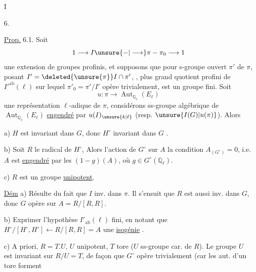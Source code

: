 I

6.

\uline{Prop.} 6.1. Soit
\[
1\longrightarrow I\unsure{-|\longrightarrow}\pi-\pi_0\longrightarrow1
\]
une extension de groupes profinis, et supposons que pour  s-groupe ouvert  $\pi'$ de $\pi$, posant $I'=\deleted{\unsure{\pi}}I\cap\pi'$,   , plus grand quotient profini  de $I'^{\mathrm{ab}}(\ell)$ sur lequel $\pi'_0=\pi'/I'$ opère trivialement, est un groupe fini. Soit
\[
u:\pi\longrightarrow\operatorname{Aut}_{\mathbb Q_\ell}(E_\ell)
\]
une représentation $\ell$-adique de $\pi$,  considérons  ss-groupe algébrique  de $\operatorname{Aut}_{\mathbb Q_\ell}(E_\ell)$ \uline{engendré} par $u(I)_{\unsure{k|\ell}}$ (resp. $\unsure{I(G)|u(\pi)}$). Alors

 a) $H$ est invariant dans $G$, donc $H^\circ$ invariant dans $G$ .

 b)  Soit $R$ le radical de $H^\circ$,  Alors l'action de $G^\circ$ sur $A$    la condition $A_{(G^\circ)}=0$, i.e. $A$ est  \uline{engendré} par les $(1-g)(A)$, où $g\in G^\circ(\mathbb Q_\ell)$.

 c) $R$ est un groupe \uline{unipotent}.

\uline{Dém} a) Résulte  du fait que $I$ inv. dans $\pi$. Il s'ensuit que $R$ est aussi inv. dans $G$, donc $G$ opère sur $A=R/[R,R]$.

 b) Exprimer l'hypothèse $I'_{\mathrm{ab}}(\ell)$ fini, en notant que $H^\circ/[H^\circ,H^\circ]\longleftarrow R/[R,R]=A$  une \uline{isogénie} .

 c) A priori, $R=T.U$, $U$ unipotent, $T$ tore ($U$ ss-groupe car. de $R$).  Le groupe $U$ est invariant  sur $R/U=T$, de façon que $G^\circ$ opère trivialement (car les aut. d'un tore forment

